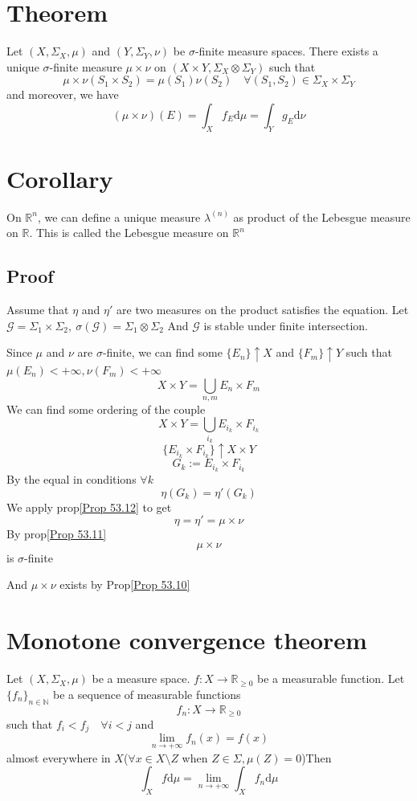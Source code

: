 \documentclass{book}
\begin{document}
\section{Theorem}
Let $(X,\Sigma_X,\mu)$ and $(Y,\Sigma_Y,\nu)$ be $\sigma$-finite measure spaces. There exists a unique $\sigma$-finite measure $\mu\times\nu$ on $(X\times Y,\Sigma_X\otimes\Sigma_Y)$ such that
$$\mu\times\nu(S_1\times S_2)=\mu(S_1)\nu(S_2)\quad \forall(S_1,S_2)\in\Sigma_X\times \Sigma_Y$$
and moreover, we have 
$$(\mu\times\nu)(E)=\int_Xf_E\text{d}\mu=\int_Yg_E\text{d}\nu$$
\section{Corollary}
On $\mathbb{R}^n$, we can define a  unique measure $\lambda^{(n)}$ as product of the Lebesgue measure on $\mathbb{R}$. This is called the Lebesgue measure on $\mathbb{R}^n$
\subsection*{Proof}
Assume that $\eta$ and $\eta'$ are two measures on the product satisfies the equation. Let $\mathcal{G}=\Sigma_1\times\Sigma_2,\ \sigma(\mathcal{G})=\Sigma_1\otimes\Sigma_2$ And $\mathcal{G}$ is stable under finite intersection.

Since $\mu$ and $\nu$ are $\sigma$-finite, we can find some $\{E_n\}\uparrow X$ and $\{F_m\}\uparrow Y$ such that $\mu(E_n)<+\infty,\nu(F_m)<+\infty$
$$X\times Y=\bigcup\limits_{n,m}E_n\times F_m$$
We can find some ordering of the couple
$$X\times Y=\bigcup\limits_{i_k}E_{i_k}\times F_{i_k}$$
$$\{E_{i_k}\times F_{i_k}\}\uparrow X\times Y$$
$$G_k:=E_{i_k}\times F_{i_k}$$
By the equal in conditions $\forall k$
$$\eta(G_k)=\eta'(G_k)$$
We apply prop\ref{Prop 53.12} to get $$\eta=\eta'=\mu\times\nu$$
By prop\ref{Prop 53.11}$$\mu\times\nu$$ is $\sigma$-finite

And $\mu\times\nu$ exists by Prop\ref{Prop 53.10}

\section{Monotone convergence theorem}
Let $(X,\Sigma_X,\mu)$ be a measure space. $f:X\rightarrow\mathbb{R}_{\geq0}$ be a measurable function. Let $\{f_n\}_{n\in \mathbb{N}}$ be a sequence of measurable functions$$f_n:X\rightarrow\mathbb{R}_{\geq 0}$$
such that $f_i<f_j\quad \forall i<j$ and $$\lim\limits_{n\rightarrow+\infty}f_n(x)=f(x)$$
almost everywhere in $X$($\forall x\in X\setminus Z$ when $Z\in \Sigma,\mu(Z)=0$)Then 
$$\int_Xf\text{d}\mu=\lim\limits_{n\rightarrow+\infty}\int_Xf_n\text{d}\mu$$
\end{document}
